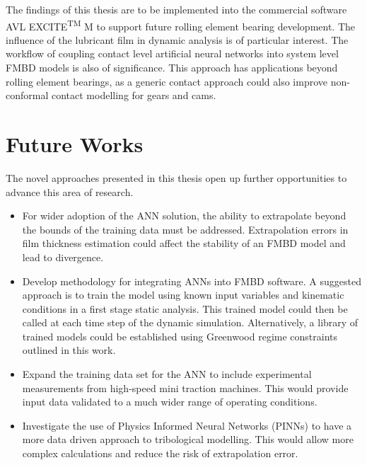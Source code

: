 The findings of this thesis are to be implemented into the commercial software AVL EXCITE\textsuperscript{TM} M to support future rolling element bearing development. The influence of the lubricant film in dynamic analysis is of particular interest. The workflow of coupling contact level artificial neural networks into system level FMBD models is also of significance. This approach has applications beyond rolling element bearings, as a generic contact approach could also improve non-conformal contact modelling for gears and cams.

\section{Future Works}

The novel approaches presented in this thesis open up further opportunities to advance this area of research.

\begin{itemize}
	\item For wider adoption of the ANN solution, the ability to extrapolate beyond the bounds of the training data must be addressed. Extrapolation errors in film thickness estimation could affect the stability of an FMBD model and lead to divergence.
	\item Develop methodology for integrating ANNs into FMBD software. A suggested approach is to train the model using known input variables and kinematic conditions in a first stage static analysis. This trained model could then be called at each time step of the dynamic simulation. Alternatively, a library of trained models could be established using Greenwood regime constraints outlined in this work.
	\item Expand the training data set for the ANN to include experimental measurements from high-speed mini traction machines. This would provide input data validated to a much wider range of operating conditions.
	\item Investigate the use of Physics Informed Neural Networks (PINNs) to have a more data driven approach to tribological modelling. This would allow more complex calculations and reduce the risk of extrapolation error.
\end{itemize}